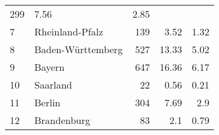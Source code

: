 \begin{longtable}{lXrrr}
       \num{299} &
       \num[round-mode=places,round-precision=2]{7.56} &
         \num[round-mode=places,round-precision=2]{2.85} \\

     7 &
     \multicolumn{1}{X}{ Rheinland-Pfalz   } &


       \num{139} &
       \num[round-mode=places,round-precision=2]{3.52} &
         \num[round-mode=places,round-precision=2]{1.32} \\

     8 &
     \multicolumn{1}{X}{ Baden-Württemberg   } &


       \num{527} &
       \num[round-mode=places,round-precision=2]{13.33} &
         \num[round-mode=places,round-precision=2]{5.02} \\

     9 &
     \multicolumn{1}{X}{ Bayern   } &


       \num{647} &
       \num[round-mode=places,round-precision=2]{16.36} &
         \num[round-mode=places,round-precision=2]{6.17} \\

     10 &
     \multicolumn{1}{X}{ Saarland   } &


       \num{22} &
       \num[round-mode=places,round-precision=2]{0.56} &
         \num[round-mode=places,round-precision=2]{0.21} \\

     11 &
     \multicolumn{1}{X}{ Berlin   } &


       \num{304} &
       \num[round-mode=places,round-precision=2]{7.69} &
         \num[round-mode=places,round-precision=2]{2.9} \\

     12 &
     \multicolumn{1}{X}{ Brandenburg   } &


       \num{83} &
       \num[round-mode=places,round-precision=2]{2.1} &
         \num[round-mode=places,round-precision=2]{0.79} \\


\end{longtable}
